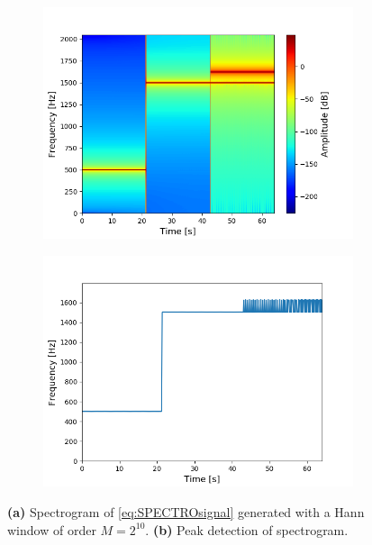 \begin{figure}[H]
\centering
\begin{subfigure}{0.49\textwidth}
\centering
\includegraphics[width=\textwidth]{figures/validation/stft/peak/spectro1024.png}
\caption{}
\label{fig:1024spec}
\end{subfigure}
\begin{subfigure}{0.49\textwidth}
\centering
\includegraphics[width=\textwidth]{figures/validation/stft/peak/peak1024.png}
\caption{}
\label{fig:1024peak}
\end{subfigure}
\caption{\textbf{(a)} Spectrogram of \eqref{eq:SPECTROsignal} generated with a Hann window of order $M=2^{10}$. \textbf{(b)} Peak detection of spectrogram.}
\label{fig:1024}
\end{figure}

